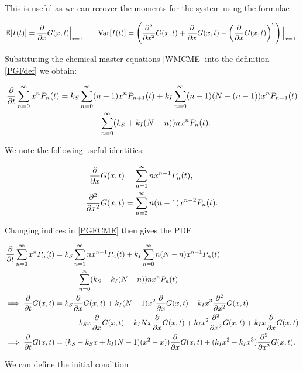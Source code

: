 \documentclass[12pt,a4paper,openany,twoside]{book}
\def \p {\partial}
\newcommand{\pd}[2]{\mathchoice{\frac{\p #1}{\p #2}}{\p #1/\p #2}{\p #1/\p #2}{\p #1/\p #2}}
\newcommand{\pdd}[2]{\mathchoice{\frac{\p^2 #1}{\p #2^2}}{\p^2 #1/\p #2^2}{\p^2 #1/\p #2^2}{\p^2 #1/\p #2^2}}
\begin{document}
This is useful as we can recover the moments for the system using the formulae

\begin{equation}
	\mathbb{E} [I(t)] = \pd {} {x} G(x, t) \Big|_{x = 1} \qquad
	\mathrm{Var} [I(t)] = \left( \pdd {} {x} G(x, t) + \pd {} {x} G(x, t) - \left( \pd {} {x} G(x, t) \right)^2 \right) \Big|_{x = 1}.
	\label{PGFident}
\end{equation}

Substituting the chemical master equations \ref{WMCME} into the definition \ref{PGFdef} we obtain:

\begin{multline}
	\pd{}{t} \sum_{n=0}^\infty x^n P_n(t) = k_S \sum_{n = 0}^\infty (n+1) x^n P_{n+1}(t) + k_I \sum_{n=0}^\infty (n-1)(N - (n-1)) x^n P_{n-1}(t) \label{PGFCME} \\
	- \sum_{n=0}^\infty (k_S + k_I (N - n))n x^n P_n(t).
\end{multline}

We note the following useful identities:

\begin{align}
	\pd {} {x} G(x, t) &= \sum_{n=1}^\infty n x^{n-1} P_n(t), \\
	\pdd{} {x} G(x, t) &= \sum_{n=2}^\infty n (n-1) x^{n-2} P_n(t).
\end{align}

Changing indices in \ref{PGFCME} then gives the PDE

\begin{equation}
\begin{aligned}
	\pd {} {t} \sum_{n = 0}^\infty x^n P_n(t) &= k_S \sum_{n = 1}^\infty n x^{n-1} P_n(t) + k_I \sum_{n = 0}^\infty n (N-n) x^{n+1} P_n(t) \\
	&\qquad - \sum_{n=0}^\infty (k_S + k_I (N-n))n x^n P_n(t) \\
	\implies \pd {} {t} G(x, t) &= k_S \pd {} {x} G(x, t) + k_I (N-1) x^2 \pd {} {x} G(x, t) - k_I x^3 \pdd {} {x} G(x, t) \\
	&\qquad - k_S x \pd {} {x} G(x, t) - k_I N x \pd {} {x} G(x, t) + k_I x^2 \pdd {} {x} G(x, t) + k_I x \pd {} {x} G(x, t) \\
	\implies \pd {} {t} G(x, t) &= (k_S - k_S x + k_I (N-1) (x^2 - x)) \pd {} {x} G(x, t) + (k_I x^2 - k_I x^3) \pdd {} {x} G(x, t).
\end{aligned}
	\label{PGFPDE}
\end{equation}

We can define the initial condition
\end{document}

